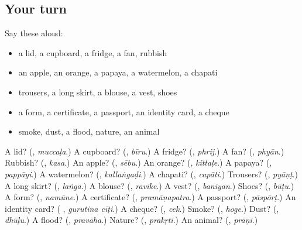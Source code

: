 \subsection*{Your turn}
Say these aloud:

\begin{itemize}
\raggedright
  \item a lid, a cupboard, a fridge, a fan, rubbish
  \item an apple, an orange, a papaya, a watermelon, a chapati
  \item trousers, a long skirt, a blouse, a vest, shoes
  \item a form, a certificate, a passport, an identity card, a cheque
  \item smoke, dust, a flood, nature, an animal
\end{itemize}

\begin{tcolorbox}[breakable,colback=teal!4,colframe=teal!35!black,title={Before you move on}]
A lid? (\textbf{}, \emph{muccaḷa}.) A cupboard? (\textbf{}, \emph{bīru}.) A fridge? (\textbf{}, \emph{phrij}.) A fan? (\textbf{}, \emph{phyān}.) Rubbish? (\textbf{}, \emph{kasa}.) An apple? (\textbf{}, \emph{sēbu}.) An orange? (\textbf{}, \emph{kittaḷe}.) A papaya? (\textbf{}, \emph{pappāyi}.) A watermelon? (\textbf{}, \emph{kallaṅgaḍi}.) A chapati? (\textbf{}, \emph{capāti}.) Trousers? (\textbf{}, \emph{pyāṇṭ}.) A long skirt? (\textbf{}, \emph{laṅga}.) A blouse? (\textbf{}, \emph{ravike}.) A vest? (\textbf{}, \emph{baniyan}.) Shoes? (\textbf{}, \emph{būṭu}.) A form? (\textbf{}, \emph{namūne}.) A certificate? (\textbf{}, \emph{pramāṇapatra}.) A passport? (\textbf{}, \emph{pāspōrṭ}.) An identity card? (\textbf{ }, \emph{gurutina cīṭi}.) A cheque? (\textbf{}, \emph{cek}.) Smoke? (\textbf{}, \emph{hoge}.) Dust? (\textbf{}, \emph{dhūḷu}.) A flood? (\textbf{}, \emph{pravāha}.) Nature? (\textbf{}, \emph{prakṛti}.) An animal? (\textbf{}, \emph{prāṇi}.)
\end{tcolorbox}
